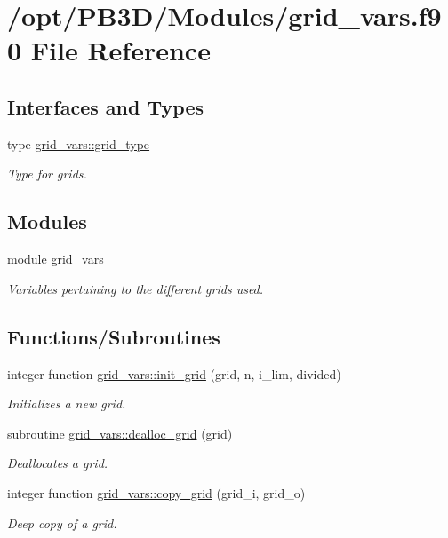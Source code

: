 \hypertarget{grid__vars_8f90}{}\section{/opt/\+P\+B3\+D/\+Modules/grid\+\_\+vars.f90 File Reference}
\label{grid__vars_8f90}
\subsection*{Interfaces and Types}
\begin{DoxyCompactItemize}
\item 
type \hyperlink{structgrid__vars_1_1grid__type}{grid\+\_\+vars\+::grid\+\_\+type}
\begin{DoxyCompactList}\small\item\em Type for grids. \end{DoxyCompactList}\end{DoxyCompactItemize}
\subsection*{Modules}
\begin{DoxyCompactItemize}
\item 
module \hyperlink{namespacegrid__vars}{grid\+\_\+vars}
\begin{DoxyCompactList}\small\item\em Variables pertaining to the different grids used. \end{DoxyCompactList}\end{DoxyCompactItemize}
\subsection*{Functions/\+Subroutines}
\begin{DoxyCompactItemize}
\item 
integer function \hyperlink{namespacegrid__vars_aa0d888796fd875e9024443e46eeb11f8}{grid\+\_\+vars\+::init\+\_\+grid} (grid, n, i\+\_\+lim, divided)
\begin{DoxyCompactList}\small\item\em Initializes a new grid. \end{DoxyCompactList}\item 
subroutine \hyperlink{namespacegrid__vars_abc8ea59261a1e773754afebdb13276f9}{grid\+\_\+vars\+::dealloc\+\_\+grid} (grid)
\begin{DoxyCompactList}\small\item\em Deallocates a grid. \end{DoxyCompactList}\item 
integer function \hyperlink{namespacegrid__vars_a6fa9a9920f1a700d50075bc9c291a247}{grid\+\_\+vars\+::copy\+\_\+grid} (grid\+\_\+i, grid\+\_\+o)
\begin{DoxyCompactList}\small\item\em Deep copy of a grid. \end{DoxyCompactList}\end{DoxyCompactItemize}
